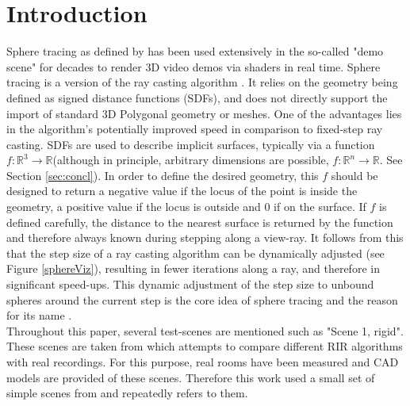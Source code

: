 \documentclass[twoside,a4paper]{article}
\begin{document}
\section{Introduction}
\label{sec:intro}
Sphere tracing as defined by \cite{hart_sphere_1996} has been used extensively in the so-called "demo scene" for decades to render 3D video demos via shaders in real time. 
Sphere tracing is a version of the ray casting algorithm \cite{roth_ray_1982}. It relies on the geometry being defined as signed distance functions (SDFs), and does not directly support the import of standard 3D Polygonal geometry or meshes. One of the advantages lies in the algorithm's potentially improved speed in comparison to fixed-step ray casting. SDFs are used to describe implicit surfaces, typically via a function $f : \mathbb{R}^3 \rightarrow \mathbb{R}$(although in principle, arbitrary dimensions are possible, $f : \mathbb{R}^n \rightarrow \mathbb{R}$. See Section \ref{sec:concl}). In order to define the desired geometry, this $f$ should be designed to return a negative value if the locus of the point is inside the geometry, a positive value if the locus is outside and 0 if on the surface. 
If $f$ is defined carefully, the distance to the nearest surface is returned by the function and therefore always known during stepping along a view-ray. 
It follows from this that the step size of a ray casting algorithm can be dynamically adjusted (see Figure \ref{sphereViz}), resulting in fewer iterations along a ray, and therefore in significant speed-ups. This dynamic adjustment of the step size to unbound spheres around the current step is the core idea of sphere tracing and the reason for its name \cite{hart_sphere_1996}. \\
Throughout this paper, several test-scenes are mentioned such as "Scene 1, rigid". These scenes are taken from \cite{brinkmann_round_2019} which attempts to compare different RIR algorithms with real recordings. For this purpose, real rooms have been measured and CAD models are provided of these scenes. Therefore this work used a small set of simple scenes from \cite{brinkmann_round_2019} and repeatedly refers to them.
\end{document}
